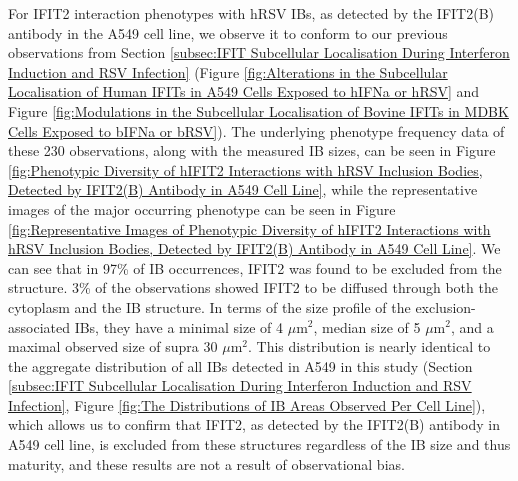 For IFIT2 interaction phenotypes with hRSV IBs, as detected by the IFIT2(B) antibody in the A549 cell line, we observe it to conform to our previous observations from Section \ref{subsec:IFIT Subcellular Localisation During Interferon Induction and RSV Infection} (Figure \ref{fig:Alterations in the Subcellular Localisation of Human IFITs in A549 Cells Exposed to hIFNa or hRSV} and Figure \ref{fig:Modulations in the Subcellular Localisation of Bovine IFITs in MDBK Cells Exposed to bIFNa or bRSV}). The underlying phenotype frequency data of these 230 observations, along with the measured IB sizes, can be seen in Figure \ref{fig:Phenotypic Diversity of hIFIT2 Interactions with hRSV Inclusion Bodies, Detected by IFIT2(B) Antibody in A549 Cell Line}, while the representative images of the major occurring phenotype can be seen in Figure \ref{fig:Representative Images of Phenotypic Diversity of hIFIT2 Interactions with hRSV Inclusion Bodies, Detected by IFIT2(B) Antibody in A549 Cell Line}. We can see that in 97\% of IB occurrences, IFIT2 was found to be excluded from the structure. 3\% of the observations showed IFIT2 to be diffused through both the cytoplasm and the IB structure. In terms of the size profile of the exclusion-associated IBs, they have a minimal size of 4 \(\mu \mbox{m}^2\), median size of 5 \(\mu \mbox{m}^2\), and a maximal observed size of supra 30 \(\mu \mbox{m}^2\). This distribution is nearly identical to the aggregate distribution of all IBs detected in A549 in this study (Section \ref{subsec:IFIT Subcellular Localisation During Interferon Induction and RSV Infection}, Figure \ref{fig:The Distributions of IB Areas Observed Per Cell Line}), which allows us to confirm that IFIT2, as detected by the IFIT2(B) antibody in A549 cell line, is excluded from these structures regardless of the IB size and thus maturity, and these results are not a result of observational bias.

